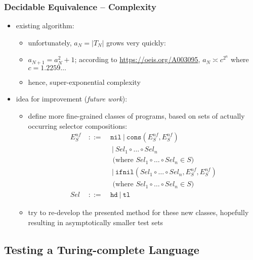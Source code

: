 \documentclass{beamer}
\begin{document}
\begin{frame}
  \frametitle{Decidable Equivalence -- Complexity}
  \begin{itemize}
    \item existing algorithm:
    \begin{itemize}
      \item unfortunately, $a_N = | T_N |$ grows very quickly:
      \item $a_{N+1} = a_N^2 + 1$; according to \url{https://oeis.org/A003095}, 
        $a_N \asymp c^{2^n}$ where $c = 1.2259\ldots$
      \item hence, super-exponential complexity
    \end{itemize}
    \item idea for improvement (\emph{future work}):
    \begin{itemize}
      \item define more fine-grained classes of programs, based on sets of
        actually occurring selector compositions:
	  \[\begin{array}{lcl}
	  E^{nf}_S & ~::=~ & \texttt{nil} ~|~ \texttt{cons}(E^{nf}_S, E^{nf}_S) \\
	         &       & ~|~ \mathit{Sel}_1 \circ \ldots \circ \mathit{Sel}_n \\
	         &       & \text{ (where } \mathit{Sel}_1 \circ \ldots \circ \mathit{Sel}_n \in S \text{)} \\
	         &       & ~|~ \texttt{ifnil}(\mathit{Sel}_1 \circ \ldots \circ \mathit{Sel}_n, E^{nf}_S, E^{nf}_S) \\
	         &       & \text{ (where } \mathit{Sel}_1 \circ \ldots \circ \mathit{Sel}_n \in S \text{)} \\
	  \mathit{Sel} & ~::=~ & \texttt{hd} ~|~ \texttt{tl} 
	  \end{array}
	  \]
	  \item try to re-develop the presented method for these new classes, hopefully
	    resulting in asymptotically smaller test sets
    \end{itemize}
  \end{itemize}
\end{frame}

\subsection{Testing a Turing-complete Language}
\end{document}
